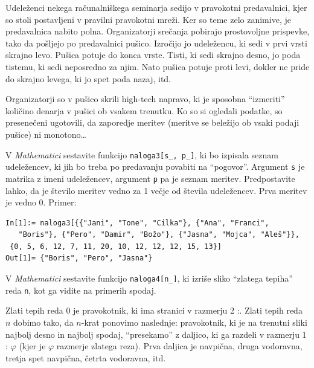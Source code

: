 \documentclass[arhiv]{../izpit}
\begin{document}
Udeleženci nekega računalniškega seminarja sedijo v pravokotni predavalnici, kjer so stoli
postavljeni v pravilni pravokotni mreži. Ker so teme zelo zanimive, je predavalnica nabito polna.
Organizatorji srečanja pobirajo prostovoljne prispevke, tako da pošljejo po predavalnici
pušico. Izročijo jo udeležencu, ki sedi v prvi vrsti skrajno levo. Pušica potuje do konca vrste. Tisti, ki sedi skrajno desno, jo poda tistemu, ki sedi neposredno za njim. Nato pušica potuje proti levi, dokler
ne pride do skrajno levega, ki jo spet poda nazaj, itd.

Organizatorji so v pušico skrili high-tech napravo, ki je sposobna ``izmeriti'' količino denarja v
pušici ob vsakem trenutku. Ko so si ogledali podatke, so presenečeni ugotovili, da zaporedje meritev
(meritve se beležijo ob vsaki podaji pušice) ni monotono\ldots

V \emph{Mathematici} sestavite funkcijo \texttt{naloga3[s\_, p\_]}, ki bo izpisala seznam
udeležencev, ki jih bo treba po predavanju povabiti na ``pogovor''. Argument \texttt{s} je matrika
z imeni udeležencev, argument \texttt{p} pa je seznam meritev. Predpostavite lahko, da je število
meritev vedno za 1 večje od števila udeležencev. Prva meritev je vedno 0. Primer:
%
\begin{verbatim}
In[1]:= naloga3[{{"Jani", "Tone", "Cilka"}, {"Ana", "Franci", 
   "Boris"}, {"Pero", "Damir", "Božo"}, {"Jasna", "Mojca", "Aleš"}},
 {0, 5, 6, 12, 7, 11, 20, 10, 12, 12, 12, 15, 13}]
Out[1]= {"Boris", "Pero", "Jasna"}
\end{verbatim}


V \emph{Mathematici} sestavite funkcijo \texttt{naloga4[n\_]}, ki izriše sliko ``zlatega tepiha'' reda \texttt{n}, kot ga vidite na primerih spodaj. 

Zlati tepih reda 0 je pravokotnik, ki ima stranici v
razmerju 2 :. Zlati tepih reda $n$ dobimo tako, da $n$-krat ponovimo naslednje: pravokotnik, ki je na trenutni sliki najbolj desno in najbolj spodaj, ``presekamo'' z daljico, ki ga razdeli
v razmerju 1 : $\varphi$ (kjer je $\varphi$ razmerje zlatega reza). Prva daljica je navpična, druga vodoravna, tretja spet navpična, četrta vodoravna, itd.
\end{document}

